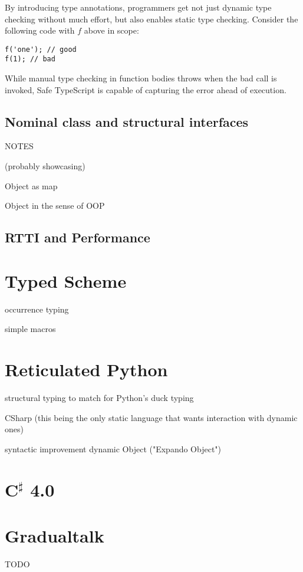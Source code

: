 By introducing type annotations, programmers get not just dynamic type checking without
much effort, but also enables static type checking. Consider the following code with $f$
above in scope:

\begin{verbatim}
f('one'); // good
f(1); // bad
\end{verbatim}

While manual type checking in function bodies throws when the bad call is invoked,
Safe TypeScript is capable of capturing the error ahead of execution.

\subsection{Nominal class and structural interfaces}


NOTES

(probably showcasing)

Object as map

Object in the sense of OOP

\subsection{RTTI and Performance}

\section{Typed Scheme}

occurrence typing

simple macros

\section{Reticulated Python}


structural typing to match for Python's duck typing

CSharp (this being the only static language that wants interaction with dynamic ones)

syntactic improvement
dynamic Object ("Expando Object")

\section{C$^\sharp$ 4.0}


\section{Gradualtalk}

TODO